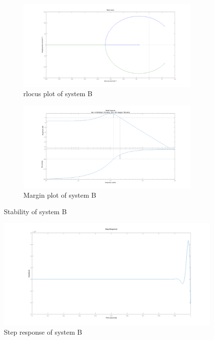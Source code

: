 \documentclass[a4paper,kul]{kulakarticle} %
\begin{document}
			\begin{figure}[h]
				\centering
				\begin{subfigure}{.5\textwidth}
					\centering
					\includegraphics[width=1\linewidth]{rlocusSystemB}
					\caption[rlocus system B]{rlocus plot of system B}
					\label{fig:rlocusSystemB}
				\end{subfigure}%
				\begin{subfigure}{.5\textwidth}
					\centering
					\includegraphics[width=1\linewidth]{marginSystemB}
					\caption[margin system B]{Margin plot of system B}
					\label{fig:marginSystemB}
				\end{subfigure}
				\caption{Stability of system B}
				\label{fig:stabilitySystemB}
			\end{figure}
			
			\begin{figure}[h]
				\centering
				\includegraphics[width=0.7\linewidth]{stepSystemB}
				\caption[step system B]{Step response of system B}
				\label{fig:stepSystemB}
			\end{figure}
		
\end{document}
